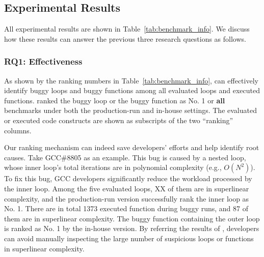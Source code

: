 \subsection{Experimental Results}
\label{sec:results}

All experimental results are shown in Table~\ref{tab:benchmark_info}.
We discuss how these results can answer the previous three research questions as follows.


\subsubsection{RQ1: Effectiveness}
As shown by the ranking numbers in Table~\ref{tab:benchmark_info},
\Tool can effectively identify buggy loops and buggy functions 
among all evaluated loops and executed functions. 
\Tool ranked the buggy loop or the buggy function as No. 1 
or \textbf{all} benchmarks under both the production-run and in-house settings. 
The evaluated or executed code constructs are shown as subscripts of 
the two ``ranking'' columns. 


Our ranking mechanism can indeed save developers' efforts 
and help identify root causes. 
Take GCC\#8805 as an example.
This bug is caused by a nested loop, 
whose inner loop's total iterations are in polynomial complexity (e.g., $O(N^2)$).
To fix this bug, GCC developers significantly reduce 
the workload processed by the inner loop. 
Among the five evaluated loops, {\color{red} XX} of them are in superlinear complexity, 
and the production-run version successfully rank the inner loop as No. 1.
There are in total 1373 executed function during buggy runs,
and 87 of them are in superlinear complexity. 
The buggy function containing the outer loop is ranked as No. 1 
by the in-house version. 
By referring the results of \Tool, 
developers can avoid manually inspecting the large number of  
suspicious loops or functions in superlinear complexity. 

